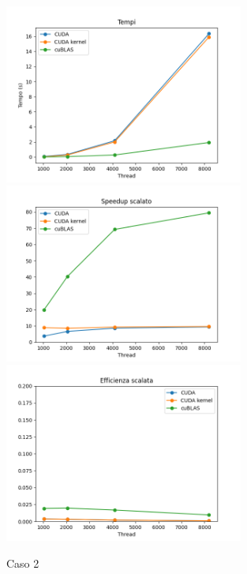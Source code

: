 \begin{figure}[h]
    \centering
    \includegraphics[width=0.7\textwidth]{./imgs/graphs/caso_b.png}
    \includegraphics[width=0.7\textwidth]{./imgs/graphs/caso_b_scaled_speedup.png}
    \includegraphics[width=0.7\textwidth]{./imgs/graphs/caso_b_scaled_efficiency.png}
    \caption{Caso 2}
\end{figure}


